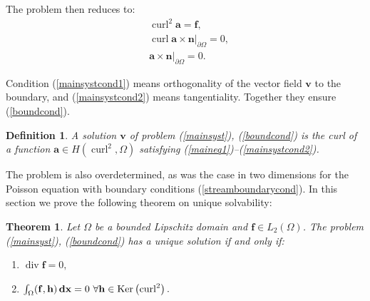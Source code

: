 \documentclass[a4paper]{article}
\newcommand{\Ker}{{\rm Ker}}
\newcommand{\bh}{\mathbf{h}}
\newcommand{\bff}{\mathbf{f}}
\newcommand{\dx}{\operatorname{\mathbf{dx}}}
\newcommand{\ba}{\mathbf{a}}
\newcommand{\curl}{\operatorname{curl}}
\newcommand{\divv}{\operatorname{div}}
\newcommand{\bv}{\mathbf{v}}
\newcommand{\bn}{\mathbf{n}}
\newtheorem{theorem}{Theorem}[section]
\newtheorem{definition}{Definition}[section]
\begin{document}
The problem then reduces to:
\begin{align}
&\curl^2 \ba = \bff, \label{maineq1} \\
&\curl \ba  \times \bn |_{\partial \Omega} = 0,\label{mainsystcond1}\\
&\ba  \times \bn |_{\partial \Omega} = 0.\label{mainsystcond2}
\end{align}

Condition (\ref{mainsystcond1}) means orthogonality of the vector field $\bv$ to the boundary, and (\ref{mainsystcond2}) means tangentiality. Together they ensure (\ref{boundcond}).

\begin{definition} A \emph{solution} $\bv$ of problem (\ref{mainsyst}), (\ref{boundcond}) is the curl of a function $\ba\in H(\curl^2, \Omega)$ satisfying (\ref{maineq1})--(\ref{mainsystcond2}).
\end{definition}

The problem is also overdetermined, as was the case in two dimensions for the Poisson equation with boundary conditions (\ref{streamboundarycond}). In this section we prove the following theorem on unique solvability:
\begin{theorem}\label{mainTh}
Let $\Omega$ be a bounded Lipschitz domain and $\bff\in L_2(\Omega)$. The problem (\ref{mainsyst}), (\ref{boundcond}) has a unique solution if and only if:
\begin{enumerate}
\item $\divv \bff = 0,$
\item $\int_{\Omega} (\bff,\bh)\dx=0~\forall \bh \in \Ker \left ( \curl^2 \right ).$
\end{enumerate}
\end{theorem}
\end{document}
